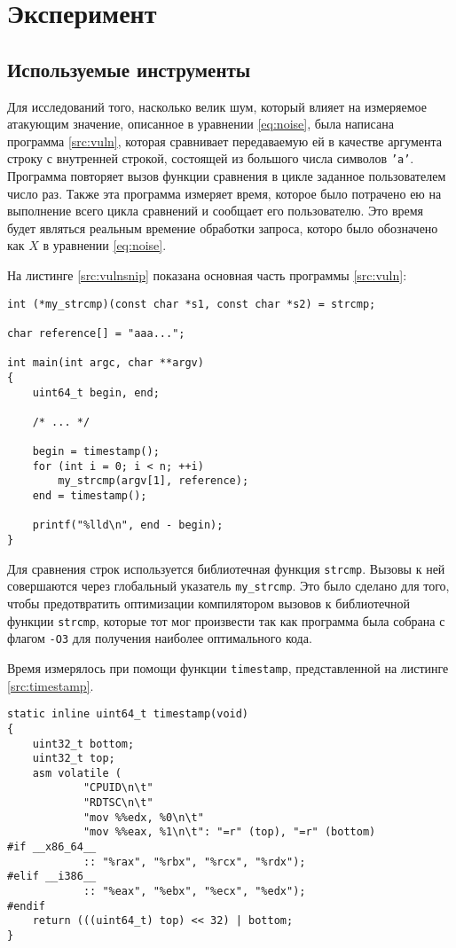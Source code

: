 \section{Эксперимент}

\subsection{Используемые инструменты}

Для исследований того, насколько велик шум, который влияет на измеряемое атакующим значение,
описанное в уравнении \ref{eq:noise}, была написана программа \ref{src:vuln}, которая сравнивает
передаваемую ей в качестве аргумента строку с внутренней строкой, состоящей из большого числа
символов \texttt{'a'}. Программа повторяет вызов функции сравнения в цикле заданное
пользователем число раз. Также эта программа измеряет время, которое было потрачено ею
на выполнение всего цикла сравнений и сообщает его пользователю. Это время будет являться
реальным времение обработки запроса, которо было обозначено как $X$ в уравнении \ref{eq:noise}.

На листинге \ref{src:vulnsnip} показана основная часть программы \ref{src:vuln}:

\begin{lstlisting}
int (*my_strcmp)(const char *s1, const char *s2) = strcmp;

char reference[] = "aaa...";

int main(int argc, char **argv)
{
	uint64_t begin, end;

	/* ... */

	begin = timestamp();
	for (int i = 0; i < n; ++i)
		my_strcmp(argv[1], reference);
	end = timestamp();

	printf("%lld\n", end - begin);
}
\end{lstlisting} \label{src:vulnsnip}

Для сравнения строк используется библиотечная функция \texttt{strcmp}. Вызовы к ней совершаются
через глобальный указатель \texttt{my\_strcmp}. Это было сделано для того, чтобы предотвратить оптимизации
компилятором вызовов к библиотечной функции \texttt{strcmp}, которые тот мог произвести так как программа
была собрана с флагом \texttt{-O3} для получения наиболее оптимального кода.

Время измерялось при помощи функции \texttt{timestamp}, представленной на листинге
\ref{src:timestamp}.

\begin{lstlisting}
static inline uint64_t timestamp(void)
{
	uint32_t bottom;
	uint32_t top;
	asm volatile (
			"CPUID\n\t"
			"RDTSC\n\t"
			"mov %%edx, %0\n\t"
			"mov %%eax, %1\n\t": "=r" (top), "=r" (bottom)
#if __x86_64__
			:: "%rax", "%rbx", "%rcx", "%rdx");
#elif __i386__
			:: "%eax", "%ebx", "%ecx", "%edx");
#endif
	return (((uint64_t) top) << 32) | bottom;
}
\end{lstlisting} \label{src:timestamp}

